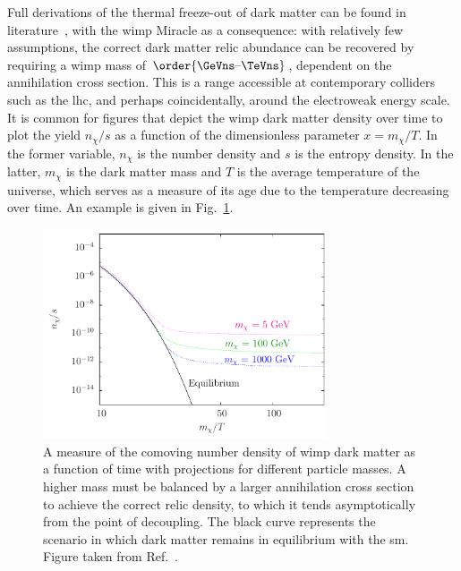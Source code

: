 Full derivations of the thermal freeze-out of dark matter can be found in literature~\cite{cosmic_abundances_stable_particles,Bender:2012gc}, with the \acrshort{wimp} Miracle as a consequence: with relatively few assumptions, the correct dark matter relic abundance can be recovered by requiring a \acrshort{wimp} mass of $\order{\text{\GeVns--\TeVns}}$, dependent on the annihilation cross section. This is a range accessible at contemporary colliders such as the \acrshort{lhc}, and perhaps coincidentally, around the electroweak energy scale. It is common for figures that depict the \acrshort{wimp} dark matter density over time to plot the yield $n_{\chi}/s$ as a function of the dimensionless parameter $x = m_{\chi}/T$. In the former variable, $n_{\chi}$ is the number density and $s$ is the entropy density. In the latter, $m_{\chi}$ is the dark matter mass and $T$ is the average temperature of the universe, which serves as a measure of its age due to the temperature decreasing over time. An example is given in Fig.~\ref{fig:theory_dm_abundance}.

\begin{figure}[htbp]
    \centering
    \includegraphics[width=0.75\textwidth]{figures/dm_abundance.pdf}
    \caption[A measure of the comoving number density of \acrshort{wimp} dark matter as a function of time with projections for different particle masses]{A measure of the comoving number density of \acrshort{wimp} dark matter as a function of time with projections for different particle masses. A higher mass must be balanced by a larger annihilation cross section to achieve the correct relic density, to which it tends asymptotically from the point of decoupling. The black curve represents the scenario in which dark matter remains in equilibrium with the \acrlong{sm}. Figure taken from Ref.~.}
    \label{fig:theory_dm_abundance}
\end{figure}

